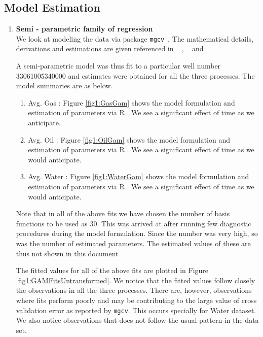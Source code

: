\documentclass[a4paper]{article}
\begin{document}
\subsection{Model Estimation}
\begin{enumerate}
	\item  \textbf{Semi - parametric family of regression ~\cite{RJC2009}  ~\cite{Gam-R-mgcv} }\\
 We look at modeling the data via package \verb|mgcv|~\cite{Gam-R-mgcv}. The mathematical details, derivations and estimations are given referenced in ~\cite{RJC2009} , ~\cite{REML-Mgcv} and ~\cite{Gam-Smoothing-Woods}

A semi-parametric model was thus fit to a particular well number 33061005340000 and estimates were obtained for all the three processes. The model summaries are as below.

\begin{enumerate}
\item Avg. Gas : Figure \ref{fig1:GasGam} shows the model formulation and estimation of parameters via R . We see a significant effect of time as we anticipate. \\
\item Avg. Oil : Figure \ref{fig1:OilGam} shows the model formulation and estimation of parameters via R . We see a significant effect of time as we would anticipate. \\
\item Avg. Water : Figure \ref{fig1:WaterGam} shows the model formulation and estimation of parameters via R . We see a significant effect of time as we would anticipate. 
\end{enumerate}

Note that in all of the above fits we have chosen the number of basis functions to be used as 30. This  was arrived at after running few diagnostic procedures during the model formulation. Since the number was very high, so was the number of estimated parameters. The estimated values of these are thus not shown in this document 

 The fitted values for all of the above fits are plotted in Figure \ref{fig1:GAMFitsUntransformed}. We notice that the fitted values follow closely the observations in all the three processes. There are, however, observations where fits perform poorly and may be contributing to the large value of cross validation error as reported by \verb|mgcv|. This occurs specially for Water dataset. We also notice observations that does not follow the usual pattern in the data set. 



\end{enumerate}
\end{document}
